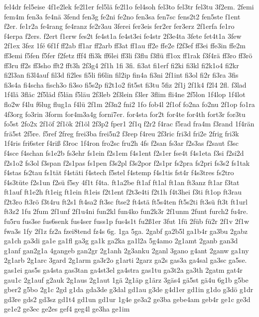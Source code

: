 {fel4dr
fel5eise
4f1e2lek
fe2l1er
fel5lä
fe2l1o
fel4soh
fel3to
fel3tr
fel3tu
3f2em.
2femi
fem4m
fen3a
fe4nä
3fend
fen3g
fe2ni
fe2no
fen3sa
fen7sc
fens2t2
fen5ste
f1ent
f2er.
fe1r2a
fe4rang
fe4ranz
fe2r3au
3ferei
fer3eis
fer2er
fer3erz
2f1erfa
fe1ro
f4erpa
f2ers.
f2ert
f1erw
fes2t
fe4st1a
fe4st3ei
fe4str
2f3e4ta
3fete
fet4t1a
3few
2f1ex
3fez
1fé
6f1f
ff2ab
ff1ar
ff2arb
ff3at
ff1au
ff2e
ffe2e
f2f3ef
ff3ei
ffe3in
ffe2m
ff3emi
f5fen
f5fer
f2fetz
fff4
ffi3k
ff6lei
ff3li
f3flu
f3flü
ff1ox
ff1rak
f3f4rä
ff3ro
ff3rö
ff3ru
ff2s
ff3sho
fft2
fft3h
2f3g4
2f1h
1fi
3fi.
fi3at
fi1erf
fi2ki
fi3kl
fi2k1o4
fi2kr
fi2l3an
fi3l4auf
fil3d
fi2les
fi5li
fi6lin
fil2ip
fin4a
fi3ni
2f1int
fi3ol
fi2r
fi3ra
3fis
fi3s4a
fi4scha
fisch3o
fi3so
fi5s2p
fi2t1o2
fit5st
fi3tu
5fiz
2f1j
2f1k4
f2l4
2fl.
f3lad
1f4lä
3fläc
2f5läd
f5län
f5läu
2f3leb
2f3lein
f3ler
3flim
fli4ne
2f5lon
1f4lop
1f4lot
flo2w
f4lu
f6lug
flug1a
f4lü
2f1m
2f3n2
fni2
1fo
fob4l
2f1of
fo2na
fo2nu
2f1op
fo1ra
4f3org
fo3rin
3form
for4m3a4g
forni7er.
for4sta
for2t
for4te
for4th
fort3r
for3tu
fo5st
2fo2x
2f1öf
2f1ök
2f1öl
2f3p2
fper1
2f1q
f2r2
f4rac
f5rad
fra4m
f3rand
1f4rän
frä5st
2f5re.
f5ref
2freg
frei3ba
frei5n2
f3rep
f4reu
2f3ric
fri3d
fri2e
2frig
fri3k
1f4ris
fri6ster
f4riß
f3roc
1f4ron
fro2sc
fru2h
4fs
f2san
fs3ar
f2s3as
f2saut
f3sc
f4sce
f4schan
fs1e2b
fs3ehr
fs1ein
f2s1em
f4s1ent
f2s1er
fse4t
f4s1eta
f3si
f2si2d
f2s1o2
fs3ol
f3span
f2s1pas
fs1pen
f3s2pl
f3s2por
f2s1pr
fs2pra
fs2pri
fs3s2
fs1tak
f4stas
fs2tau
fs1tät
f4stäti
f4stech
f5stel
f4stemp
f4s1tis
fst4r
f4s3tres
fs2tro
f4s3tüte
f2s1un
f2sü
f5sy
4f1t
f4ta.
ft1a2be
ft1af
ft1al
ft1an
ft3anz
ft1ar
f3tat
ft1auf
ft1e2h
ft1eig
ft1ein
ft1eis
f2t1ent
f2t3e4ti
f2t1h
f4t3hei
f3ti
ft1op
ft3rau
f2t3ro
ft3rö
f3t4ru
ft2s1
ft4sa2
ft3sc
ftse2
ft4stä
ft5s4ten
ft5s2ti
ft3sü
ft3t
ft1url
ft3z2
1fu
2fum
2f1unf
2f1u4ni
fun2kl
fun4ko
fun2k3r
2f1unm
2funt
furch2
fu4re.
fu5ru
fus3se
fus6senk
fus4ser
fuss1p
fus4s1t
fu2ß1er
3fut
1fü
2füb
fü2r
2f1v
2f1w
fwa3s
1fy
2f1z
fz2a
fzei8tend
fz4s
6g.
1ga
5ga.
2gabf
ga2b5l
ga1b4r
ga3bu
2gabz
ga1ch
ga3di
ga1e
ga1fl
ga3g
ga1k
ga2ka
ga1l2a
5g4amo
2g1amt
2ganb
gan3d
g1anf
gan2g1a
4gangeb
gan2gr
2g1anh
2g3anku
2ganl
3gano
g4ant
2ganw
ga1ny
2g1arb
2g1arc
3gard
2g1arm
ga3r2o
g1arti
2garz
ga2s
gas3a
ga4sal
ga3sc
ga5se.
gas1ei
gas5s
ga4sta
gas3tan
ga4st3el
ga4stra
gas1tu
ga3t2a
ga3th
2gatm
gat4r
gau1c
2g1auf
g2auk
2g1aus
2g1aut
1gä
2g1äp
g1ärz
3gäs4
gä5st
gä4u
6g1b
g5be
gber2
g5bo
2g1c
2gd
g1da
gda3de
g3dal
gd1au
g3de
g4d1er
gd1in
g1do
g3dö
g1dr
gd3re
gds2
gd3sz
gd1t4
gd1un
gd1ur
1g4e
ge3a2
ge3ba
gebe4am
geb4r
ge1c
ge3d
ge1e2
ge3ec
ge2es
gef4
geg4l
ge3ha
ge1im
}
